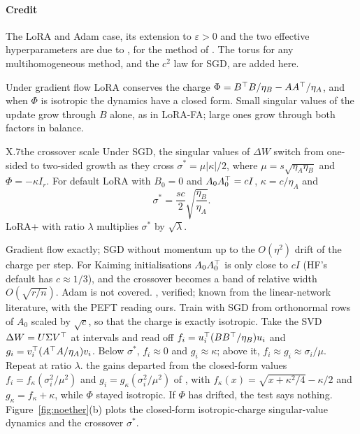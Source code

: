 \paragraph{Credit}
The LoRA and Adam case, its extension to $\varepsilon>0$ and the two effective hyperparameters are due to
\citet{schulman2025lora}, for the method of \citet{hayou2024lora}. The torus for any multihomogeneous method, and the
$c^2$ law for SGD, are added here.

Under gradient flow LoRA conserves the charge $\Phi=B^{\top} B/\eta_B-AA^{\top}/\eta_A$, and when $\Phi$ is isotropic the
dynamics have a closed form. Small singular values of the update grow through $B$ alone, as in LoRA-FA; large ones grow
through both factors in balance.

\begin{prediction}{X.7}{the crossover scale}
Under SGD, the singular values of $\Delta W$ switch from one-sided to two-sided growth as they cross
$\sigma^*=\mu\lvert\kappa\rvert/2$, where $\mu=s\sqrt{\eta_A\eta_B}$ and $\Phi=-\kappa I_r$. For default LoRA with
$B_0=0$ and $A_0A_0^{\top}=cI$, $\kappa=c/\eta_A$ and
\begin{equation}\label{eq:pred-crossover}
  \sigma^*=\frac{sc}{2}\sqrt{\frac{\eta_B}{\eta_A}}.
\end{equation}
LoRA+ with ratio $\lambda$ multiplies $\sigma^*$ by $\sqrt\lambda$.
\begin{predmeta}
   Gradient flow exactly; SGD without momentum up to the $O(\eta^2)$ drift of the charge per step. For
    Kaiming initialisations $A_0A_0^{\top}$ is only close to $cI$ (HF's default has $c\approx1/3$), and the crossover becomes
    a band of relative width $O(\sqrt{r/n})$. Adam is not covered.
   , verified; known from the linear-network literature, with the PEFT
    reading ours.
   Train with SGD from orthonormal rows of $A_0$ scaled by $\sqrt c$, so that the charge is exactly
    isotropic. Take the SVD $\Delta W=U\Sigma V^{\top}$ at intervals and read off $f_i=u_i^{\top}(BB^{\top}/\eta_B)u_i$ and
    $g_i=v_i^{\top}(A^{\top} A/\eta_A)v_i$. Below $\sigma^*$, $f_i\approx0$ and $g_i\approx\kappa$; above it,
    $f_i\approx g_i\approx\sigma_i/\mu$. Repeat at ratio $\lambda$.
   the gains departed from the closed-form values $f_i=f_\kappa(\sigma_i^2/\mu^2)$ and
    $g_i=g_\kappa(\sigma_i^2/\mu^2)$ of , with $f_\kappa(x)=\sqrt{x+\kappa^2/4}-\kappa/2$ and
    $g_\kappa=f_\kappa+\kappa$, while $\Phi$ stayed isotropic. If $\Phi$ has drifted, the test says nothing.
   Figure~\ref{fig:noether}(b) plots the closed-form isotropic-charge singular-value dynamics and the
    crossover $\sigma^*$.
\end{predmeta}
\end{prediction}

